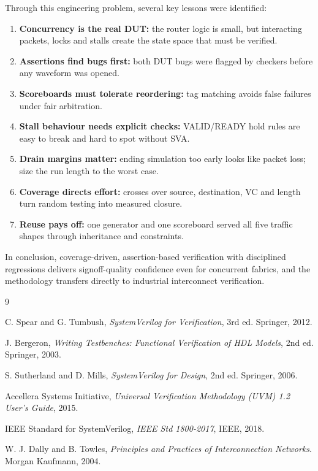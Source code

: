 \documentclass[11pt,a4paper]{report}  %
\begin{document}
Through this engineering problem, several key lessons were identified:

\begin{enumerate}
    \item \textbf{Concurrency is the real DUT:} the router logic is small, but
    interacting packets, locks and stalls create the state space that must be
    verified.
    \item \textbf{Assertions find bugs first:} both DUT bugs were flagged by
    checkers before any waveform was opened.
    \item \textbf{Scoreboards must tolerate reordering:} tag matching avoids
    false failures under fair arbitration.
    \item \textbf{Stall behaviour needs explicit checks:} VALID/READY hold rules
    are easy to break and hard to spot without SVA.
    \item \textbf{Drain margins matter:} ending simulation too early looks like
    packet loss; size the run length to the worst case.
    \item \textbf{Coverage directs effort:} crosses over source, destination,
    VC and length turn random testing into measured closure.
    \item \textbf{Reuse pays off:} one generator and one scoreboard served all
    five traffic shapes through inheritance and constraints.
\end{enumerate}

In conclusion, coverage-driven, assertion-based verification with disciplined
regressions delivers signoff-quality confidence even for concurrent fabrics,
and the methodology transfers directly to industrial interconnect verification.

\begin{thebibliography}{9}

     C. Spear and G. Tumbush, \textit{SystemVerilog for Verification}, 3rd ed. Springer, 2012.

     J. Bergeron, \textit{Writing Testbenches: Functional Verification of HDL Models}, 2nd ed. Springer, 2003.

     S. Sutherland and D. Mills, \textit{SystemVerilog for Design}, 2nd ed. Springer, 2006.

     Accellera Systems Initiative, \textit{Universal Verification Methodology (UVM) 1.2 User's Guide}, 2015.

     IEEE Standard for SystemVerilog, \textit{IEEE Std 1800-2017}, IEEE, 2018.

     W. J. Dally and B. Towles, \textit{Principles and Practices of Interconnection Networks}. Morgan Kaufmann, 2004.

\end{thebibliography}
\end{document}
